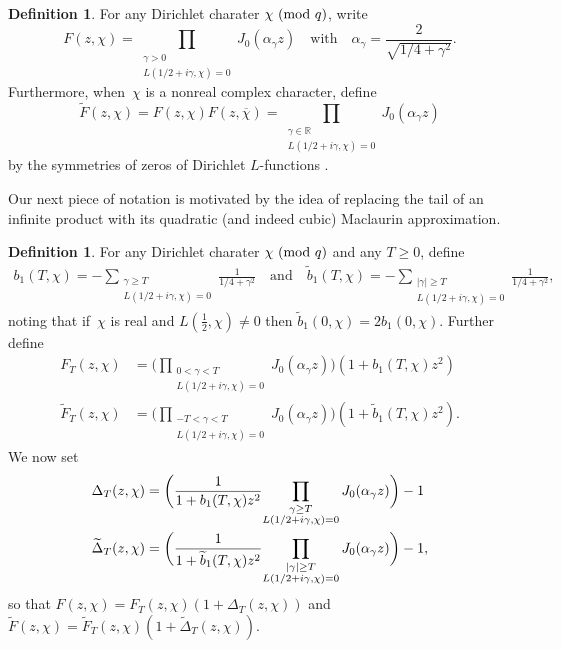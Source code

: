 \documentclass[11pt]{article}
\theoremstyle{plain}
\theoremstyle{definition}
\newtheorem{definition}[thm]{Definition}
\numberwithin{equation}{section}
\renewcommand{\mod}[1]{{\ifmmode\text{\rm\ (mod~$#1$)}\else\discretionary{}{}{\hbox{\!\!}}\rm(mod~$#1$)\fi}}
\newcommand{\R}{\mathbb R}
\newcommand{\0}{{\vec 0}}
\begin{document}
\begin{definition} \label{alpha def}
For any Dirichlet charater $\chi\mod q$, write
\[
F(z,\chi) = \prod_{\substack{\gamma>0 \\ L(1/2+i\gamma,\chi)=0}} J_0(\alpha_\gamma z)
\quad\text{with}\quad
\alpha_\gamma=\frac{2}{\sqrt{1/4+\gamma^2}}.
\]
Furthermore, when~$\chi$ is a nonreal complex character, define
\[
\widetilde{F}(z,\chi) = F(z,\chi)F(z,\overline{\chi}) = \prod_{\substack{\gamma\in\R \\ L(1/2+i\gamma,\chi)=0}} J_0(\alpha_\gamma z)
\]
by the symmetries of zeros of Dirichlet $L$-functions .
\end{definition}

Our next piece of notation is motivated by the idea of replacing the tail of an infinite product with its quadratic (and indeed cubic) Maclaurin approximation.

\begin{definition} \label{Delta_T def}
For any Dirichlet charater $\chi\mod q$ and any $T\ge0$, define
\begin{align*}
b_1(T,\chi)=-\sum_{\substack{{\gamma\ge T} \\ L(1/2+i\gamma,\chi)=0}} \frac1{1/4+\gamma^2}
\quad\text{and}\quad
\widetilde{b}_1(T,\chi) = -\sum_{\substack{{|\gamma|\ge T} \\ L(1/2+i\gamma,\chi)=0}} \frac1{1/4+\gamma^2},
\end{align*}
noting that if~$\chi$ is real and $L(\frac12,\chi)\ne0$ then $\widetilde{b}_1(0,\chi) = 2{b}_1(0,\chi)$.
Further define
\begin{align*}
F_T(z,\chi) &= \biggl( \prod_{\substack{{0<\gamma<T} \\ L(1/2+i\gamma,\chi)=0}} J_0(\alpha_\gamma z) \biggr) (1+b_1(T,\chi)z^2) \\
\widetilde{F}_T(z,\chi) &= \biggl(\prod_{\substack{{-T<\gamma<T} \\ L(1/2+i\gamma,\chi)=0}} J_0(\alpha_\gamma z) \biggr) (1+\widetilde{b}_1(T,\chi)z^2).
\end{align*}
We now set
\begin{align*}
\Delta_T(z,\chi) &= \biggl( \frac1{1+b_1(T,\chi)z^2} {\prod_{\substack{{\gamma\ge T} \\ L(1/2+i\gamma,\chi)=0}} J_0(\alpha_\gamma z)} \biggr) -1 \notag \\
\widetilde{\Delta}_T(z,\chi) &= \biggl( \frac1{1+\widetilde{b}_1(T,\chi)z^2}
{\prod_{\substack{{|\gamma|\ge T} \\ L(1/2+i\gamma,\chi)=0}} J_0(\alpha_\gamma z)} \biggr) -1,
\end{align*}
so that $F(z,\chi)=F_T(z,\chi)(1+\Delta_T(z,\chi))$ and $\widetilde{F}(z,\chi)=\widetilde{F}_T(z,\chi)(1+\widetilde{\Delta}_T(z,\chi))$.
\end{definition}
\end{document}
